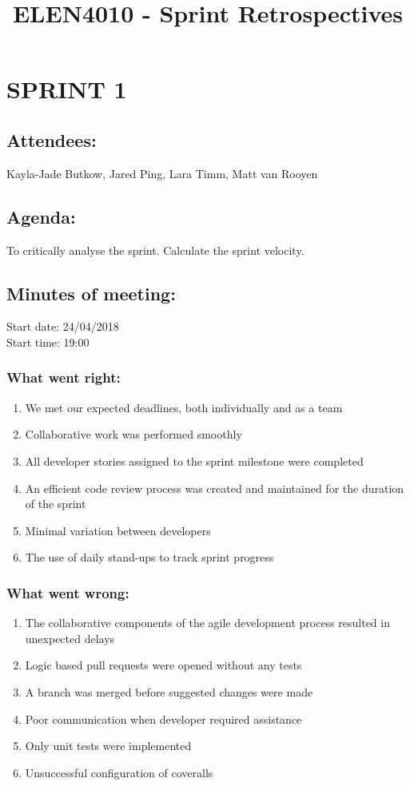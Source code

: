 \documentclass[10pt,onecolumn]{witseiepaper}
\title{ELEN4010 - Sprint Retrospectives}
\author{}
\begin{document}
\maketitle
\pagestyle{plain}
\setcounter{page}{1}

\section*{SPRINT 1}
\subsection*{Attendees:}
Kayla-Jade Butkow, Jared Ping, Lara Timm, Matt van Rooyen
\subsection*{Agenda:} 
To critically analyse the sprint. Calculate the sprint velocity.

\subsection*{Minutes of meeting:}
Start date: 24/04/2018 \\
Start time: 19:00

\subsubsection*{What went right:}
\begin{enumerate}
	\item We met our expected deadlines, both individually and as a team
	\item Collaborative work was performed smoothly
	\item All developer stories assigned to the sprint milestone were completed
	\item An efficient code review process was created and maintained for the duration of the sprint
	\item Minimal variation between developers 
	\item The use of daily stand-ups to track sprint progress
\end{enumerate}

\subsubsection*{What went wrong:}
\begin{enumerate}
	\item The collaborative components of the agile development process resulted in unexpected delays
	\item Logic based pull requests were opened without any tests
	\item A branch was merged before suggested changes were made
	\item Poor communication when developer required assistance
	\item Only unit tests were implemented 
	\item Unsuccessful configuration of coveralls
\end{enumerate}
\end{document}
